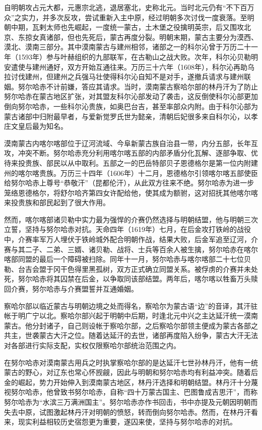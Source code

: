 自明朝攻占元大都，元惠宗北逃，退居塞北，史称北元。当时北元仍有“不下百万众”之实力，并多次反攻，尝试重新入主中原，经过明朝多次讨伐一度衰落。至明朝中期，瓦剌太师也先崛起，一度统一蒙古，土木堡之役擒明英宗，后又围攻北京、东掠女真诸部，但也先死后，蒙古再度分裂。明朝末期，蒙古主要分为漠西、漠北、漠南三部分。其中漠南蒙古与建州相邻，诸部之一的科尔沁曾于万历二十一年（1593年）参与叶赫组织的九部联军，在古勒山之战大败。次年，科尔沁贝勒明安遣使与建州通好，双方开始互通往来。万历三十六年（1608年），科尔沁再助乌拉讨伐建州，但建州之兵强马壮使得科尔沁自知不是对手，遂撤兵请求与建州联姻。努尔哈赤不计前嫌，答应其请求。当时，漠南蒙古察哈尔部的林丹汗为了防止努尔哈赤在蒙古地区扩张，对其盟友科尔沁部发动了袭击，这反倒使科尔沁部更加倒向努尔哈赤，一些科尔沁贵族，如奥巴台吉，甚至率部众内附。由于科尔沁部为蒙古诸部中归附最早者，与爱新觉罗氏世为懿亲，清朝后妃很多来自科尔沁，以孝庄文皇后最为知名。

漠南蒙古内喀尔喀部位于辽河流域、今阜新蒙古族自治县一带，内分五部，长年互攻，冲突不断。努尔哈赤充分利用喀尔喀五部的内部矛盾分化瓦解、逐部争取、优待来投贵族、部民以从中取利。五部之一的巴岳特部贝子恩德格尔是第一位内附建州的喀尔喀贵族。万历三十四年（1606年）十二月，恩德格尔引领喀尔喀五部使臣给努尔哈赤上尊号“恭敬汗”（昆都伦汗），从此双方往来不绝。努尔哈赤为进一步笼络恩德格尔，将舒尔哈齐第四女许配给他，使其成为额驸，这对招抚其他喀尔喀来投贵族和部民起到了很大作用。

然而，喀尔喀部诸贝勒中实力最为强悍的介赛仍然选择与明朝结盟，他与明朝三次立誓，坚持与努尔哈赤对抗。天命四年（1619年）七月，在后金攻打铁岭的战役中，介赛率军万人埋伏于铁岭城外配合明朝作战，结果大败，后金军追至辽河，介赛与其二子、二弟、三婿、诸贝勒、战将、士兵等百余人被生擒，努尔哈赤在喀尔喀部同盟的最后一个障碍被扫除。同年十一月，努尔哈赤与喀尔喀部二十七位贝勒、台吉会盟于冈干色得里黑孤树，双方正式确立同盟关系。被俘虏的介赛并未处死，努尔哈赤将其囚禁在后金，以争取同该部结盟。两年后，喀尔喀以牲畜万头赎回介赛，努尔哈赤与介赛盟誓并互通婚姻。

察哈尔部以临近蒙古与明朝边境之处而得名，察哈尔为蒙古语“边”的音译，其汗驻帐于明广宁以北。察哈尔部兴起于明朝中后期，时逢北元中兴之主达延汗统一漠南蒙古。他分封诸子，自己则设帐于察哈尔部，之后察哈尔部领主便成为蒙古各部之共主，世袭蒙古大汗之位。随着达延汗的去世，诸部再度陷入纷争，蒙古大汗无法对各部进行实际支配，实权仅限察哈尔部统治范围之内。

在努尔哈赤对漠南蒙古用兵之时执掌察哈尔部的是达延汗七世孙林丹汗，他有一统蒙古的野心，对辽东也常心怀觊觎，因此与明朝和努尔哈赤均有利益冲突。随着后金的崛起，势力开始伸入到漠南蒙古地区，林丹汗选择和明朝结盟。林丹汗十分蔑视努尔哈赤，他曾致书努尔哈赤，自称“四十万蒙古国主、巴图鲁成吉思汗”，而称努尔哈赤为“水滨三万满洲国主”。努尔哈赤亦作书回击，书中亦提及元朝因明朝而失去中原，试图激起林丹汗对明朝的愤怒，转而倒向努尔哈赤。然而，在林丹汗看来，现实利益相较历史宿怨更为重要，遂囚来使，坚持与努尔哈赤的对抗。

